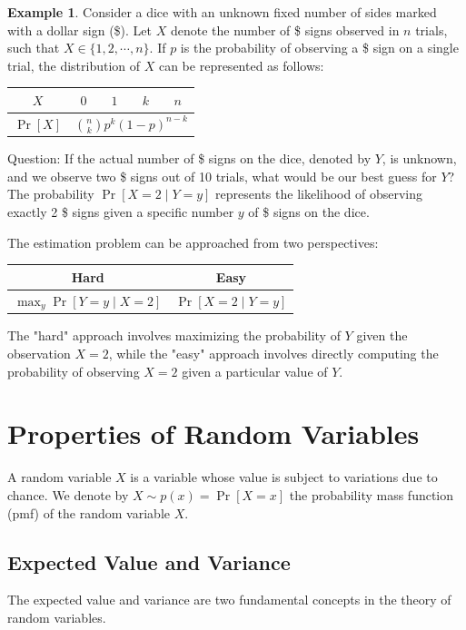 \documentclass[12pt,openany]{book}
\theoremstyle{definition}
\newtheorem{example}{Example}[chapter]
\begin{document}
	\begin{example}
		Consider a dice with an unknown fixed number of sides marked with a dollar sign (\$). Let $X$ denote the number of \$ signs observed in $n$ trials, such that $X \in \{1, 2, \cdots, n\}$. If $p$ is the probability of observing a \$ sign on a single trial, the distribution of $X$ can be represented as follows:
		
		\begin{center}
			\begin{tabular}{c|cccc}
				$X$ & $0$ & $1$ & $k$ & $n$ \\
				\hline
				$\Pr[X]$ & \multicolumn{4}{c}{$\binom{n}{k}p^k(1-p)^{n-k}$} \\
			\end{tabular}
		\end{center}
		
		Question: If the actual number of \$ signs on the dice, denoted by $Y$, is unknown, and we observe two \$ signs out of 10 trials, what would be our best guess for $Y$? The probability $\Pr[X=2 \mid Y=y]$ represents the likelihood of observing exactly 2 \$ signs given a specific number $y$ of \$ signs on the dice.
		
		The estimation problem can be approached from two perspectives:
		
		\begin{center}
			\begin{tabular}{c|c}
				Hard & Easy \\
				\hline
				$\max_y \Pr[Y=y \mid X=2]$ & $\Pr[X=2 \mid Y=y]$ \\
			\end{tabular}
		\end{center}
		
		The "hard" approach involves maximizing the probability of $Y$ given the observation $X=2$, while the "easy" approach involves directly computing the probability of observing $X=2$ given a particular value of $Y$.
	\end{example}
	
	\section{Properties of Random Variables}
	A random variable \( X \) is a variable whose value is subject to variations due to chance. We denote by \( X \sim p(x) = \Pr[X = x] \) the probability mass function (pmf) of the random variable \( X \).
	
	\subsection{Expected Value and Variance}
	The expected value and variance are two fundamental concepts in the theory of random variables.
	
\end{document}
